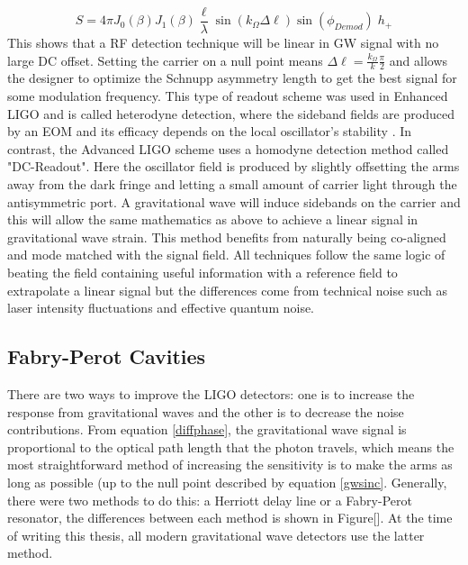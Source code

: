 		\begin{equation}
		S = 4 \pi  J_0(\beta) J_1(\beta) \frac{\ell}{\lambda}  \sin(k_{\Omega} \Delta \ell) \sin(\phi_{Demod}) \; h_{+}
		\end{equation}
		This shows that a RF detection technique will be linear in GW signal with no large DC offset. Setting the carrier on a null point means $\Delta \ell = \frac{k_{\Omega}}{k} \frac{\pi}{2}$ and allows the designer to optimize the Schnupp asymmetry length to get the best signal for some modulation frequency. This type of readout scheme was used in Enhanced LIGO and is called heterodyne detection, where the sideband fields are produced by an EOM and its efficacy depends on the local oscillator's stability \cite{FritschelReadout}.  
		In contrast, the Advanced LIGO scheme uses a homodyne detection \cite{HildDCReadout} method called "DC-Readout".  Here the oscillator field is produced by slightly offsetting the arms away from the dark fringe and letting a small amount of carrier light through the antisymmetric port.  A gravitational wave will induce sidebands on the carrier and this will allow the same mathematics as above to achieve a linear signal in gravitational wave strain. This method benefits from naturally being co-aligned and mode matched with the signal field.  All techniques follow the same logic of beating the field containing useful information with a reference field to extrapolate a linear signal but the differences come from technical noise such as laser intensity fluctuations and effective quantum noise.
		
		\cite{BlackPDH}	
	
		\subsection{Fabry-Perot Cavities}\label{FP}
		There are two ways to improve the LIGO detectors: one is to increase the response from gravitational waves and the other is to decrease the noise contributions. From equation \ref{diffphase}, the gravitational wave signal is proportional to the optical path length that the photon travels, which means the most straightforward method of increasing the sensitivity is to make the arms as long as possible (up to the null point described by equation \ref{gwsinc}.  Generally, there were two methods to do this: a Herriott delay line or a Fabry-Perot resonator, the differences between each method is shown in Figure[].  At the time of writing this thesis, all modern gravitational wave detectors use the latter method.
	
